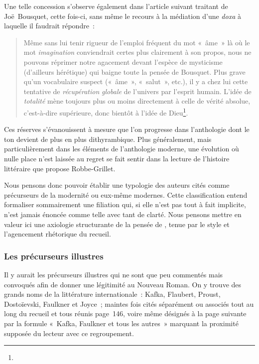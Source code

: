 \documentclass[12pt, a4paper]{article}
\begin{document}
Une telle concession s'observe également dans l'article suivant traitant de Joë~Bousquet, cette fois-ci, sans même le recours à la médiation d'une \textit{doxa} à laquelle il faudrait répondre~:
\begin{quote}
    Même sans lui tenir rigueur de l’emploi fréquent du mot «~âme~» là où le mot \textit{imagination} conviendrait certes plus clairement à son propos, nous ne pouvons réprimer notre agacement devant l’espèce de mysticisme (d’ailleurs hérétique) qui baigne toute la pensée de Bousquet. Plus grave qu’un vocabulaire suspect («~âme~», «~salut~», etc.), il y a chez lui cette tentative de \textit{récupération} \textit{globale} de l’univers par l’esprit humain. L’idée de \textit{totalité} mène toujours plus ou moins directement à celle de vérité absolue, c’est-à-dire supérieure, donc bientôt à l’idée de Dieu\footnote{}.
\end{quote}

Ces réserves s'évanouissent à mesure que l'on progresse dans l'anthologie dont le ton devient de plus en plus dithyrambique. Plus généralement, mais particulièrement dans les éléments de l'anthologie moderne, une évolution où nulle place n'est laissée au regret se fait sentir dans la lecture de l'histoire littéraire que propose Robbe-Grillet.

Nous pensons donc pouvoir établir une typologie des auteurs cités comme précurseurs de la modernité ou eux-même modernes. Cette classification entend formaliser sommairement une filiation qui, si elle n'est pas tout à fait implicite, n'est jamais énoncée comme telle avec tant de clarté. Nous pensons mettre en valeur ici une axiologie structurante de la pensée de \punr, tenue par le style et l'agencement rhétorique du recueil.

\subsubsection{Les précurseurs illustres}
Il y aurait les précurseurs illustres qui ne sont que peu commentés mais convoqués afin de donner une légitimité au Nouveau Roman. On y trouve des grands noms de la littérature internationale~: Kafka, Flaubert, Proust, Dostoïevski, Faulkner et Joyce~; maintes fois cités séparément ou associés tout au long du recueil et tous réunis page~146, voire même désignés à la page suivante par la formule «~Kafka, Faulkner et tous les autres~» marquant la proximité supposée du lecteur avec ce regroupement.
\end{document}
